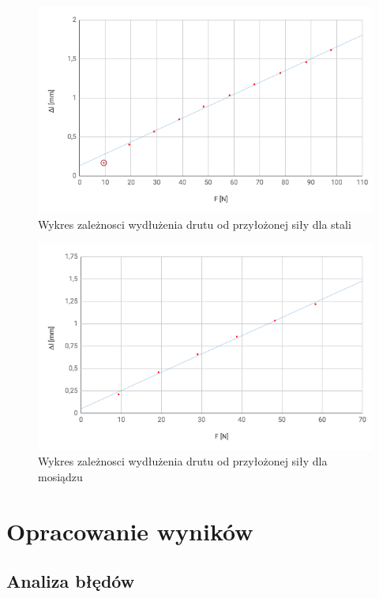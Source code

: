 \documentclass[a4paper,10pt,twoside]{article}
\begin{document}
\begin{figure}[!htp]
\centerline{\includegraphics[scale=0.65]{steel_wire_first_point_marked.png}}
\caption{Wykres zależnosci wydłużenia drutu od przyłożonej siły dla stali}
\label{fig:tl}
\end{figure}

\begin{figure}[!htp]
\centerline{\includegraphics[scale=0.65]{brass_wire.png}}
\caption{Wykres zależnosci wydłużenia drutu od przyłożonej siły dla mosiądzu}
\label{fig:tl}
\end{figure}

\newpage

\section{Opracowanie wyników}

\subsection{Analiza błędów}
\end{document}
